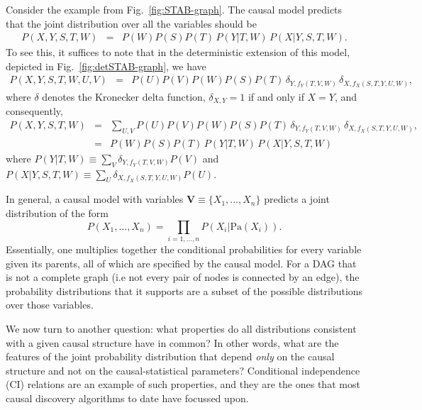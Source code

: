 \documentclass[letterpaper,onecolumn,nofootinbib]{revtex4}
\begin{document}
Consider the example from Fig.~\ref{fig:STAB-graph}.  The causal
model predicts that the joint distribution over all the variables should be
\begin{eqnarray}
P(X,Y,S,T,W)&=& P\left( W \right) P\left( S\right) P(T)\,P(Y|T,W)\,P(X|Y,S,T,W). \label{eq:exdist}
\end{eqnarray}
 To see this, it suffices to note that in the deterministic extension of this model, depicted in Fig.~\ref{fig:detSTAB-graph}, we have
\begin{eqnarray}
P(X,Y,S,T,W,U,V)&=& P\left(U\right) P\left( V \right) P\left( W \right) P\left( S\right) P(T)\, \delta_{Y,f_Y(T,V,W)} \, \delta_{X,f_X(S,T,Y,U,W)}, \label{eq:exdist}
\end{eqnarray}
where $\delta$ denotes the Kronecker delta function, $\delta_{X,Y}=1$ if and only if $X=Y$, and consequently,
\begin{eqnarray}
P(X,Y,S,T,W)&=& \sum_{U,V} P\left(U\right) P\left( V \right) P\left( W \right) P\left( S\right) P(T)\, \delta_{Y,f_Y(T,V,W)} \, \delta_{X,f_X(S,T,Y,U,W)}, \nonumber\\
&=&P\left( W \right) P\left( S\right) P(T)\,P(Y|T,W)\,P(X|Y,S,T,W)\,
\label{eq:exdist}
\end{eqnarray}
where $P(Y|T,W)\equiv \sum_V \delta_{Y,f_Y(T,V,W)} P\left(V\right) $ and $P(X|Y,S,T,W)\equiv \sum_U \delta_{X,f_X(S,T,Y,U,W)} P(U)$.
\color{black}

In general, a causal model with variables $\mathbf{V}\equiv \{ X_1,\dots,X_n\}$ predicts a joint distribution of the form
\begin{equation} \label{eq:jointdistribution}
P(X_1,\dots,X_n) = \prod_{i=1,\dots,n} P(X_i|\text{Pa}(X_i)).
\end{equation}
Essentially, one multiplies together the conditional probabilities for every
variable given its parents, all of which are specified by the causal model.
For a DAG that is not a complete graph (i.e not every pair of nodes is connected by an edge), the probability distributions that it supports are a subset of the possible distributions over those variables.

We now turn to another question: what properties do all distributions consistent with a given causal structure have in common?  In other words, what are the features of the joint probability distribution that depend \emph{only} on the causal structure and not on the causal-statistical parameters?  Conditional independence (CI) relations are an example of such properties, and they are the ones that most causal discovery algorithms to date have focussed upon.
\end{document}
